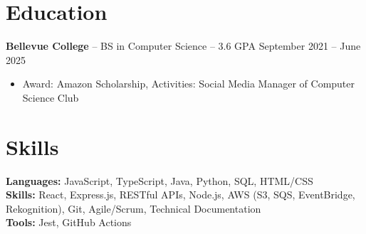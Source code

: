 \documentclass[11pt]{article}       %
\begin{document}

\vspace{-18.5pt}

\section*{Education}
\textbf{Bellevue College} -- BS in Computer Science -- 3.6 GPA \hfill September 2021 -- June 2025\\
\vspace{-9pt}
\begin{itemize}
  \item Award: Amazon Scholarship, Activities: Social Media Manager of Computer Science Club
\end{itemize}

\vspace{-18.5pt}

\section*{Skills}
\textbf{Languages:} JavaScript, TypeScript, Java, Python, SQL, HTML/CSS\\
\textbf{Skills:} React, Express.js, RESTful APIs, Node.js, AWS (S3, SQS, EventBridge, Rekognition), Git, Agile/Scrum, Technical Documentation\\
\textbf{Tools:} Jest, GitHub Actions

\vspace{-6.5pt}
\end{document}
